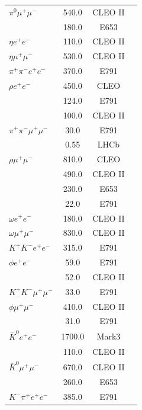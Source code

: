 \begin{longtable}{l|ccc}
\hline
$\pi{}^0\mu{}^+\mu{}^-$ & 540.0 & CLEO II & \cite{Freyberger:1996it}\\
& 180.0 & E653 & \cite{Kodama:1995ia}\\
\hline
$\eta{}e^+e^-$ & 110.0 & CLEO II & \cite{Freyberger:1996it}\\
\hline
$\eta{}\mu{}^+\mu{}^-$ & 530.0 & CLEO II & \cite{Freyberger:1996it}\\
\hline
$\pi{}^+\pi{}^-e^+e^-$ & 370.0 & E791 & \cite{Aitala:2000kk}\\
\hline
$\rho{}e^+e^-$ & 450.0 & CLEO & \cite{Haas:1988bh}\\
& 124.0 & E791 & \cite{Aitala:2000kk}\\
& 100.0 & CLEO II & \cite{Freyberger:1996it}\\
\hline
$\pi{}^+\pi{}^-\mu{}^+\mu{}^-$ & 30.0 & E791 & \cite{Aitala:2000kk}\\
& 0.55 & LHCb & \cite{Aaij:2013uoa}\\
\hline
$\rho{}\mu{}^+\mu{}^-$ & 810.0 & CLEO & \cite{Haas:1988bh}\\
& 490.0 & CLEO II & \cite{Freyberger:1996it}\\
& 230.0 & E653 & \cite{Kodama:1995ia}\\
& 22.0 & E791 & \cite{Aitala:2000kk}\\
\hline
$\omega{}e^+e^-$ & 180.0 & CLEO II & \cite{Freyberger:1996it}\\
\hline
$\omega{}\mu{}^+\mu{}^-$ & 830.0 & CLEO II & \cite{Freyberger:1996it}\\
\hline
$K^+K^-e^+e^-$ & 315.0 & E791 & \cite{Aitala:2000kk}\\
\hline
$\phi{}e^+e^-$ & 59.0 & E791 & \cite{Aitala:2000kk}\\
& 52.0 & CLEO II & \cite{Freyberger:1996it}\\
\hline
$K^+K^-\mu{}^+\mu{}^-$ & 33.0 & E791 & \cite{Aitala:2000kk}\\
\hline
$\phi{}\mu{}^+\mu{}^-$ & 410.0 & CLEO II & \cite{Freyberger:1996it}\\
& 31.0 & E791 & \cite{Aitala:2000kk}\\
\hline
$\overline{K}^0e^+e^-$ & 1700.0 & Mark3 & \cite{Adler:1988es}\\
& 110.0 & CLEO II & \cite{Freyberger:1996it}\\
\hline
$\overline{K}^0\mu{}^+\mu{}^-$ & 670.0 & CLEO II & \cite{Freyberger:1996it}\\
& 260.0 & E653 & \cite{Kodama:1995ia}\\
\hline
$K^-\pi{}^+e^+e^-$ & 385.0 & E791 & \cite{Aitala:2000kk}\\

\end{longtable}
